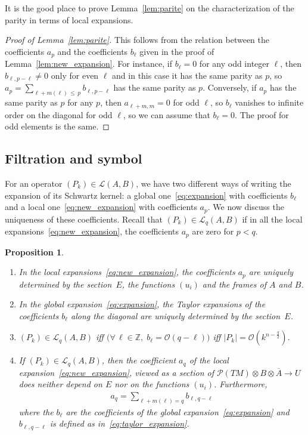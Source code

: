 \documentclass[10pt,a4paper]{article}
\newtheorem{prop}[theo]{Proposition}
\theoremstyle{definition}
\numberwithin{equation}{section}
\newcommand{\Z}{{\mathbb{Z}}}
\newcommand{\con}{\overline}
\newcommand{\bigo}{\mathcal{O}}
\newcommand{\lag}{\mathcal{L}}
\newcommand{\pol}{\mathcal{P}}
\let\oldforall\forall
\renewcommand*{\forall}{\mathrel{\oldforall}}
\begin{document}
It is the good place to prove Lemma~\ref{lem:parite} on the characterization of the parity in terms of local expansions.
\begin{proof}[Proof of Lemma~\ref{lem:parite}]
This follows from the relation between the coefficients $a_{p}$ and the coefficients $b_{\ell}$ given in the proof of Lemma~\ref{lem:new_expansion}. For instance, if $b_{\ell} =0$ for any odd integer $\ell$, then $b_{\ell, p-\ell} \neq 0$ only for even $\ell$ and in this case it has the same parity as $p$, so $ a_p = \sum _{\ell + m (\ell)
\,\leqslant\,p } b_{\ell, p - \ell} $ has the same parity as $p$. Conversely, if $a_{p}$ has the same parity as $p$ for any $p$, then $a_{ \ell+m, m } =0$ for odd $\ell$, so $b_{\ell} $ vanishes to infinite order on the diagonal for odd $\ell$, so we can assume that $b_{\ell} =0$. The proof for odd elements is the same.
\end{proof}



\subsection{Filtration and symbol}
For an operator $(P_k) \in \lag (A,B)$, we have two different ways of writing the expansion of its Schwartz kernel: a global one~\eqref{eq:expansion} with coefficients $b_\ell$ and a local one~\eqref{eq:new_expansion} with coefficients $a_p$. We now discuss the uniqueness of these coefficients. Recall that $(P_k) \in \lag_q (A,B)$ if in all the local expansions~\eqref{eq:new_expansion}, the coefficients $a_{p} $ are zero for $p < q$.

\begin{prop}\label{prop:filtration-symbol}\leavevmode
\begin{enumerate}
\item\label{prop5.5.1} In the local expansions~\eqref{eq:new_expansion}, the coefficients $a_{p}$ are uniquely determined by the section~$E$, the functions $(u_i)$ and the frames of $A$ and $B$.
\item\label{prop5.5.2} In the global expansion~\eqref{eq:expansion}, the Taylor expansions of the coefficients $b_{\ell}$ along the diagonal are uniquely determined by the section~$E$.
\item\label{prop5.5.3} $ (P_k) \in \lag_q (A,B)$ iff $\bigl(\forall \, \ell \in\Z, \; b_{\ell} = \bigo (q - \ell) \bigr)$ iff $| P_k | = \bigo (k^{n-\frac{q}{2}}) $.
\item\label{prop5.5.4} If $(P_k) \in \lag_q (A,B)$, then the coefficient $a_q$ of the local expansion~\eqref{eq:new_expansion}, viewed as a section of $ \pol (TM) \otimes B \otimes \con{A} \rightarrow U$ does neither depend on $E$ nor on the functions $(u_i)$. Furthermore,
\begin{gather}\label{eq:a_n_fonction_b_ell}
a_q = \sum_{\ell + m (\ell) = q} b_{\ell, q - \ell}
\end{gather}
where the $b_{\ell}$ are the coefficients of the global expansion~\eqref{eq:expansion} and $b_{\ell, q-\ell}$ is defined as in~\eqref{eq:taylor_expansion}.
\end{enumerate}
\end{prop}
\end{document}
